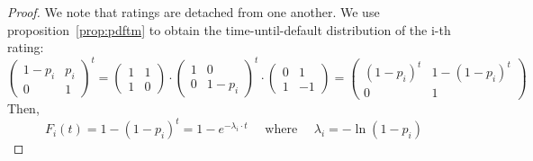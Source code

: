 \documentclass[11pt,fleqn]{book} %
\begin{document}
\begin{proof}
	We note that ratings are detached from one another. We use 
	proposition~\ref{prop:pdftm} to obtain the time-until-default distribution 
	of the i-th rating:
	\small
	\begin{displaymath}
		\left(
		\begin{array}{cc}
			1-p_i & p_i \\
			0 & 1
		\end{array}
		\right) ^ t 
		= 
		\left(
		\begin{array}{cc}
			1 & 1 \\
			1 & 0
		\end{array}
		\right) 
		\cdot
		\left(
		\begin{array}{cc}
			1 & 0 \\
			0 & 1-p_i
		\end{array}
		\right) ^t 
		\cdot
		\left(
		\begin{array}{cc}
			0 & 1 \\
			1 & -1
		\end{array}
		\right)
		=
		\left(
		\begin{array}{cc}
			(1-p_i)^t & 1-(1-p_i)^t \\
			0 & 1
		\end{array}
		\right)
	\end{displaymath}
	Then,
	\begin{displaymath}
		F_i(t) = 1-(1-p_i)^t = 1 - e^{-\lambda_i \cdot t} \quad \text{ where } \quad \lambda_i = -\ln(1-p_i)
	\end{displaymath}
\end{proof}
\end{document}
